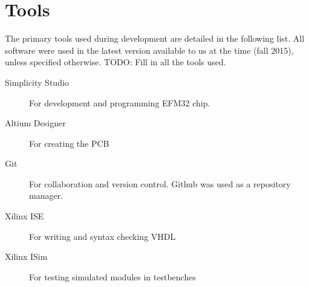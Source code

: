 \chapter{Tools}
The primary tools used during development are detailed in the following list. All software were used in the latest version available to us at the time (fall 2015), unless specified otherwise.
TODO: Fill in all the tools used.

\begin{description}
    \item[Simplicity Studio] For development and programming EFM32 chip.
    \item[Altium Designer] For creating the PCB
    \item[Git] For collaboration and version control. Github was used as a repository manager.
    \item[Xilinx ISE] For writing and syntax checking VHDL
    \item[Xilinx ISim] For testing simulated modules in testbenches
\end{description}
